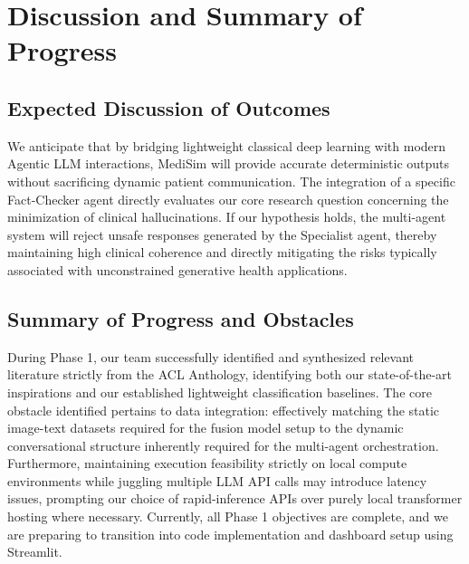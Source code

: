 \documentclass[11pt,a4paper]{article}
\begin{document}
\section{Discussion and Summary of Progress}

\subsection{Expected Discussion of Outcomes}
We anticipate that by bridging lightweight classical deep learning with modern Agentic LLM interactions, MediSim will provide accurate deterministic outputs without sacrificing dynamic patient communication. The integration of a specific Fact-Checker agent directly evaluates our core research question concerning the minimization of clinical hallucinations. If our hypothesis holds, the multi-agent system will reject unsafe responses generated by the Specialist agent, thereby maintaining high clinical coherence and directly mitigating the risks typically associated with unconstrained generative health applications. 

\subsection{Summary of Progress and Obstacles}
During Phase 1, our team successfully identified and synthesized relevant literature strictly from the ACL Anthology, identifying both our state-of-the-art inspirations and our established lightweight classification baselines. The core obstacle identified pertains to data integration: effectively matching the static image-text datasets required for the fusion model setup to the dynamic conversational structure inherently required for the multi-agent orchestration. Furthermore, maintaining execution feasibility strictly on local compute environments while juggling multiple LLM API calls may introduce latency issues, prompting our choice of rapid-inference APIs over purely local transformer hosting where necessary. Currently, all Phase 1 objectives are complete, and we are preparing to transition into code implementation and dashboard setup using Streamlit.


\end{document}
